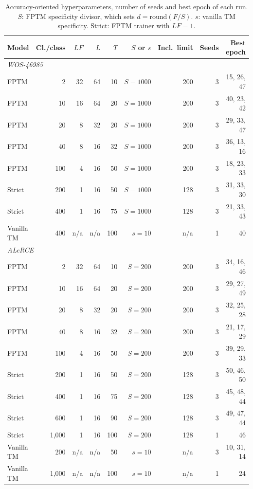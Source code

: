 \documentclass[preprint,12pt]{elsarticle}
\newcommand{\LF}{\mathit{LF}}
\begin{document}
\begin{table}[H]
\footnotesize
\setlength{\tabcolsep}{4pt}
\centering
\caption{Accuracy-oriented hyperparameters, number of seeds and best epoch of each run. $S$: FPTM specificity divisor, which sets $d=\mathrm{round}(F/S)$. $s$: vanilla TM specificity. Strict: FPTM trainer with $\LF=1$.}
\label{tab:hyperfull}
\begin{tabular}{lrrrrrrrr}
\toprule
Model & Cl./class & $\LF$ & $L$ & $T$ & $S$ or $s$ & Incl.\ limit & Seeds & Best epoch \\
\midrule
\multicolumn{9}{l}{\textit{WOS-46985}} \\
FPTM & 2 & 32 & 64 & 10 & $S=1000$ & 200 & 3 & 15, 26, 47 \\
FPTM & 10 & 16 & 64 & 20 & $S=1000$ & 200 & 3 & 40, 23, 42 \\
FPTM & 20 & 8 & 32 & 20 & $S=1000$ & 200 & 3 & 29, 33, 47 \\
FPTM & 40 & 8 & 16 & 32 & $S=1000$ & 200 & 3 & 36, 13, 16 \\
FPTM & 100 & 4 & 16 & 50 & $S=1000$ & 200 & 3 & 18, 23, 33 \\
Strict & 200 & 1 & 16 & 50 & $S=1000$ & 128 & 3 & 31, 33, 30 \\
Strict & 400 & 1 & 16 & 75 & $S=1000$ & 128 & 3 & 21, 33, 43 \\
Vanilla TM & 400 & n/a & n/a & 100 & $s=10$ & n/a & 1 & 40 \\
\midrule
\multicolumn{9}{l}{\textit{ALeRCE}} \\
FPTM & 2 & 32 & 64 & 10 & $S=200$ & 200 & 3 & 34, 16, 46 \\
FPTM & 10 & 16 & 64 & 20 & $S=200$ & 200 & 3 & 29, 27, 49 \\
FPTM & 20 & 8 & 32 & 20 & $S=200$ & 200 & 3 & 32, 25, 28 \\
FPTM & 40 & 8 & 16 & 32 & $S=200$ & 200 & 3 & 21, 17, 29 \\
FPTM & 100 & 4 & 16 & 50 & $S=200$ & 200 & 3 & 39, 29, 33 \\
Strict & 200 & 1 & 16 & 50 & $S=200$ & 128 & 3 & 50, 46, 50 \\
Strict & 400 & 1 & 16 & 75 & $S=200$ & 128 & 3 & 45, 48, 44 \\
Strict & 600 & 1 & 16 & 90 & $S=200$ & 128 & 3 & 49, 47, 44 \\
Strict & 1,000 & 1 & 16 & 100 & $S=200$ & 128 & 1 & 46 \\
Vanilla TM & 200 & n/a & n/a & 50 & $s=10$ & n/a & 3 & 10, 31, 14 \\
Vanilla TM & 1,000 & n/a & n/a & 100 & $s=10$ & n/a & 1 & 24 \\

\end{tabular}
\end{table}
\end{document}
